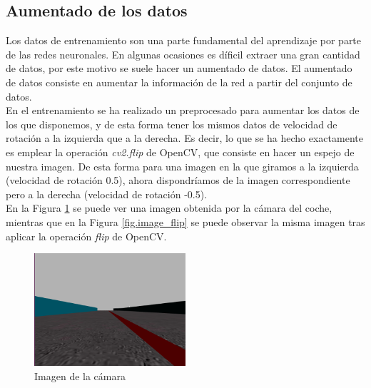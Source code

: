 \subsection{Aumentado de los datos}

Los datos de entrenamiento son una parte fundamental del aprendizaje por parte de las redes neuronales. En algunas ocasiones es díficil extraer una gran cantidad de datos, por este motivo se suele hacer un aumentado de datos. El aumentado de datos consiste en aumentar la información de la red a partir del conjunto de datos.\\

En el entrenamiento se ha realizado un preprocesado para aumentar los datos de los que disponemos, y de esta forma tener los mismos datos de velocidad de rotación a la izquierda que a la derecha. Es decir, lo que se ha hecho exactamente es emplear la operación \textit{cv2.flip} de OpenCV, que consiste en hacer un espejo de nuestra imagen. De esta forma para una imagen en la que giramos a la izquierda (velocidad de rotación 0.5), ahora dispondríamos de la imagen correspondiente pero a la derecha (velocidad de rotación -0.5).\\

En la Figura \ref{fig.image_camera} se puede ver una imagen obtenida por la cámara del coche, mientras que en la Figura \ref{fig.image_flip} se puede observar la misma imagen tras aplicar la operación \textit{flip} de OpenCV.\\


\begin{figure}[H]
\begin{center}
	\includegraphics[width=0.5\textwidth]{figures/Regresion/img_normal.png}
   \caption{Imagen de la cámara}
	\label{fig.image_camera}
\end{center}
\end{figure}

